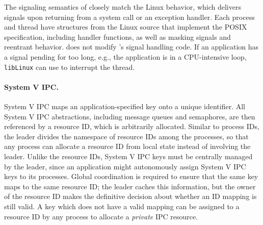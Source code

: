 The signaling semantics of \thelibos{} closely match the Linux behavior, which
delivers signals upon returning from a system call
or an exception handler.
Each process and thread have  structures from the Linux source 
that implement the
POSIX specification, including handler functions, as well as masking signals and
reentrant behavior.
\thelibos{} does not modify \libc{}'s signal handling code. %
If an application has a signal pending for too long,
e.g., the application is in a CPU-intensive loop, {\tt libLinux} can use  to interrupt the thread. 




\begin{comment}
\graphene{} internally indexes point-to-point handles using PIDs.
In order to facilitate reallocation of PIDs without global coordination, 
\graphene{}-internal PIDs also include a {\em generation number},
allowing \picoprocs{} to lazily detect reuse similar to generation numbers 
for inodes in NFS~\cite{sandberg85nfs}.
\end{comment}

\paragraph{System V IPC.} System V IPC
maps an application-specified key onto a unique identifier.
All System V IPC abstractions, including message queues and semaphores,
are then referenced by a resource ID, which is arbitrarily allocated.
Similar to process IDs, 
the leader divides the namespace of resource IDs among the processes,
so that any process
can allocate a resource ID from local state instead of involving the leader. %
Unlike the resource IDs, System V IPC keys must be centrally managed
by the leader,
since an application might autonomously assign System V IPC keys to its processes.
Global coordination is required to ensure that the same key maps to the same resource ID;
the leader caches this information, but the owner of the resource ID 
makes the definitive decision about whether an ID mapping is still valid.
A key which does not have a valid mapping can be assigned to a resource ID by any process to allocate a {\em private} IPC resource.



